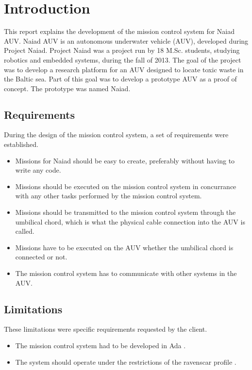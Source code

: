 \section{Introduction}\label{sec:introduction}
This report explains the development of the mission control system for Naiad AUV. Naiad AUV is an autonomous underwater vehicle (AUV), developed during Project Naiad. Project Naiad was a project run by 18 M.Sc. students, studying robotics and embedded systems, during the fall of 2013. The goal of the project was to develop a research platform for an AUV designed to locate toxic waste in the Baltic sea. Part of this goal was to develop a prototype AUV as a proof of concept. The prototype was named Naiad.

\subsection{Requirements}
During the design of the mission control system, a set of requirements were established.
\begin{itemize}
\item Missions for Naiad should be easy to create, preferably without having to write any code.
\item Missions should be executed on the mission control system in concurrance with any other tasks performed by the mission control system.
\item Missions should be transmitted to the mission control system through the umbilical chord, which is what the physical cable connection into the AUV is called.
\item Missions have to be executed on the AUV whether the umbilical chord is connected or not.
\item The mission control system has to communicate with other systems in the AUV.
\end{itemize}

\subsection{Limitations}
These limitations were specific requirements requested by the client.
\begin{itemize}
\item The mission control system had to be developed in Ada \cite{web:mcsada}.
\item The system should operate under the restrictions of the ravenscar profile \cite{article:mcsraven}. 
\end{itemize}
